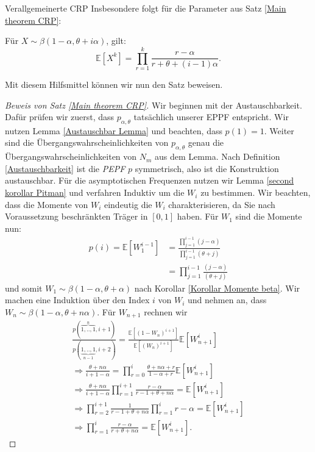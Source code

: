 \begin{section}{Verallgemeinerte CRP}
Insbesondere folgt für die Parameter aus Satz \ref{Main theorem CRP}: 
\begin{Korollar}
    \label{Korollar Momente beta}
    Für $X \sim \beta(1-\alpha,\theta + i\alpha)$, gilt:
    \[
    \mathbb{E}[X^k] = \prod_{r=1}^{k}\frac{r-\alpha}{r+\theta +(i-1)\alpha }.
    \]
\end{Korollar}
Mit diesem Hilfsmittel können wir nun den Satz beweisen.
\begin{proof}[Beweis von Satz \ref{Main theorem CRP}]
   Wir beginnen mit der Austauschbarkeit. Dafür prüfen wir zuerst, dass $p_{\alpha,\theta}$ tatsächlich unserer EPPF entspricht. Wir nutzen Lemma \ref{Austauschbar Lemma} und beachten, dass $p(1) = 1$. Weiter sind die Übergangswahrscheinlichkeiten von $p_{\alpha,\theta}$ genau die Übergangswahrscheinlichkeiten von $N_m$ aus dem Lemma. Nach Definition \ref{Austauschbarkeit} ist die \textit{PEPF} $p$ symmetrisch, also ist die Konstruktion austauschbar. Für die asymptotischen Frequenzen nutzen wir Lemma \ref{second korollar Pitman} und verfahren Induktiv um die $W_i$ zu bestimmen. Wir beachten, dass die Momente von $W_i$ eindeutig die $W_i$ charakterisieren, da Sie nach Voraussetzung beschränkten Träger in $[0,1]$ haben. Für $W_1$ sind die Momente nun:
    \begin{align*}
    p(i)= \mathbb{E}[W_1^{i-1}] &= \frac{\prod_{j=1}^{i-1}(j-\alpha)}{\prod_{j=1}^{i-1}(\theta+j)}\\
    &= \prod_{j=1}^{i-1}\frac{(j-\alpha)}{(\theta+j)}
    \end{align*}
und somit $W_1 \sim \beta(1-\alpha,\theta + \alpha)$ nach Korollar \ref{Korollar Momente beta}. Wir machen eine Induktion über den Index $i$ von $W_i$ und nehmen an, dass $W_n \sim \beta(1-\alpha,\theta+n\alpha)$. Für $W_{n+1}$ rechnen wir
    \begin{align*}
    \frac{p(\overbrace{1,..,1}^{n},i+1)}{p(\underbrace{1,..,1}_{n-1},i+2)}= \frac{\mathbb{E}[(1-W_n)^{i+1}]}{\mathbb{E}[(W_n)^{i+1}]}\mathbb{E}[W_{n+1}^i] \\
    \Rightarrow \frac{\theta + n\alpha}{i+1-\alpha}=  \prod_{r=0}^{i}\frac{\theta + n\alpha + r}{{1-\alpha + r}}\mathbb{E}[W_{n+1}^i]\\
    \Rightarrow \frac{\theta + n\alpha}{i+1-\alpha}\prod_{r=1}^{i+1}\frac{{r-\alpha }}{ r -1 + \theta + n\alpha }=  \mathbb{E}[W_{n+1}^i]\\
    \Rightarrow \prod_{r=2}^{i+1}\frac{1}{r -1 + \theta + n\alpha}\prod_{r=1}^{i}r-\alpha =  \mathbb{E}[W_{n+1}^i]\\
    \Rightarrow \prod_{r=1}^{i}\frac{r-\alpha}{r+\theta+n\alpha} = \mathbb{E}[W_{n+1}^i].

\end{align*}
\end{proof}
\end{section}
